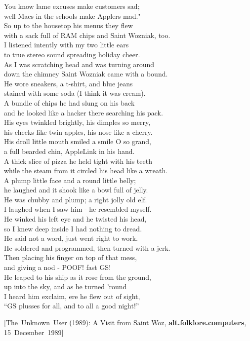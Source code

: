 \documentclass{report}
\newcommand{\citeusenet}[7]
{\rmfamily\footnotesize[\mbox{#1} (#3): #4, {\bfseries#5}, \mbox{#7 #3}]}
\newenvironment{usenet}{\raggedright\small\ttfamily}{\rmfamily}
\begin{document}
\begin{usenet}
        You know lame excuses make customers sad;\\
        well Macs in the schools make Applers mad."\\
        So up to the housetop his menus they flew\\
        with a sack full of RAM chips and Saint Wozniak, too.\\
        I listened intently with my two little ears\\
        to true stereo sound spreading holiday cheer.\\
        As I was scratching head and was turning around\\
        down the chimney Saint Wozniak came with a bound.\\
        He wore sneakers, a t-shirt, and blue jeans\\
        stained with some soda (I think it was cream).\\
        A bundle of chips he had slung on his back\\
        and he looked like a hacker there searching his pack.\\
        His eyes twinkled brightly, his dimples so merry,\\
        his cheeks like twin apples, his nose like a cherry.\\
        His droll little mouth smiled a smile O so grand,\\
        a full bearded chin, AppleLink in his hand.\\
        A thick slice of pizza he held tight with his teeth\\
        while the steam from it circled his head like a wreath.\\
        A plump little face and a round little belly;\\
        he laughed and it shook like a bowl full of jelly.\\
        He was chubby and plump; a right jolly old elf.\\
        I laughed when I saw him - he resembled myself.\\
        He winked his left eye and he twisted his head,\\
        so I knew deep inside I had nothing to dread.\\
        He said not a word, just went right to work.\\
        He soldered and programmed, then turned with a jerk.\\
        Then placing his finger on top of that mess,\\
        and giving a nod - POOF! fast GS!\\
        He leaped to his ship as it rose from the ground,\\
        up into the sky, and as he turned 'round\\
        I heard him exclaim, ere he flew out of sight,\\
        ``GS plusses for all, and to all a good night!''

        \citeusenet{The Unknown User}{unknown@ucscb.ucsc.edu}{1989}{A Visit from Saint Woz}{alt.folklore.computers}{\_mXEGBQNF\_A}
            {15 December}
    \end{usenet}
\end{document}
